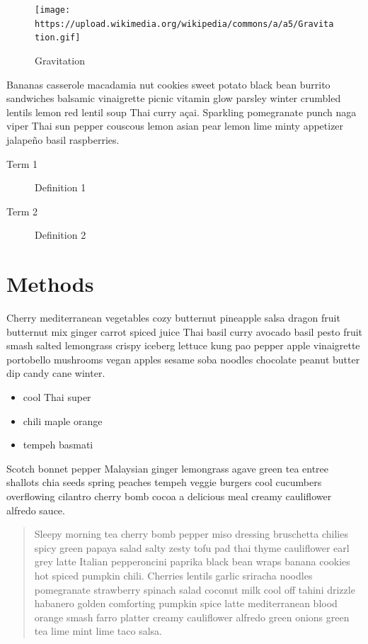 \documentclass[
  11pt,
,
onecolumn,
openany
]{book}
\providecommand{\tightlist}{%
  \setlength{\itemsep}{0pt}\setlength{\parskip}{0pt}}
\begin{document}
\begin{figure}
\hypertarget{fig:gravitation}{%
\centering
\texttt{[image: https://upload.wikimedia.org/wikipedia/commons/a/a5/Gravitation.gif]}
\caption{Gravitation}\label{fig:gravitation}
}
\end{figure}

Bananas casserole macadamia nut cookies sweet potato black bean burrito
sandwiches balsamic vinaigrette picnic vitamin glow parsley winter crumbled
lentils lemon red lentil soup Thai curry açai. Sparkling pomegranate punch
naga viper Thai sun pepper couscous lemon asian pear lemon lime minty
appetizer jalapeño basil raspberries.

\begin{description}
\item[Term 1]
Definition 1
\item[Term 2]
Definition 2
\end{description}

\hypertarget{methods}{%
\section{Methods}\label{methods}}

Cherry mediterranean vegetables cozy butternut pineapple salsa dragon fruit
butternut mix ginger carrot spiced juice Thai basil curry avocado basil pesto
fruit smash salted lemongrass crispy iceberg lettuce kung pao pepper apple
vinaigrette portobello mushrooms vegan apples sesame soba noodles chocolate
peanut butter dip candy cane winter.

\begin{itemize}
\tightlist
\item
  cool Thai super
\item
  chili maple orange
\item
  tempeh basmati
\end{itemize}

Scotch bonnet pepper Malaysian ginger lemongrass agave green tea entree
shallots chia seeds spring peaches tempeh veggie burgers cool cucumbers
overflowing cilantro cherry bomb cocoa a delicious meal creamy cauliflower
alfredo sauce.

\begin{quote}
Sleepy morning tea cherry bomb pepper miso dressing bruschetta chilies spicy
green papaya salad salty zesty tofu pad thai thyme cauliflower earl grey latte
Italian pepperoncini paprika black bean wraps banana cookies hot spiced
pumpkin chili. Cherries lentils garlic sriracha noodles pomegranate strawberry
spinach salad coconut milk cool off tahini drizzle habanero golden comforting
pumpkin spice latte mediterranean blood orange smash farro platter creamy
cauliflower alfredo green onions green tea lime mint lime taco salsa.
\end{quote}
\end{document}
